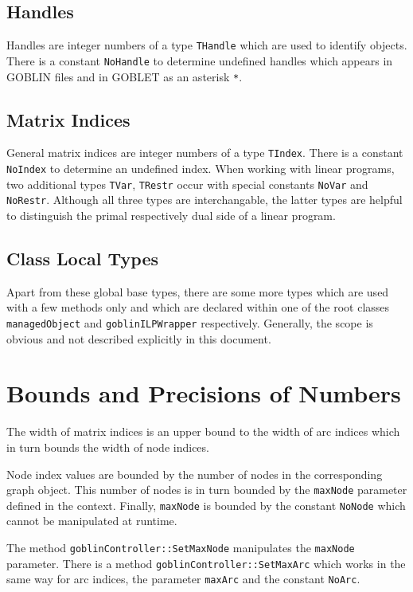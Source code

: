 \documentclass[a4paper,11pt,twoside]{book}
\begin{document}
\begin{multicols}{2}
\subsection{Handles}

Handles are integer numbers of a type \verb/THandle/ which are used to identify
objects. There is a constant \verb/NoHandle/ to determine undefined handles
which appears in GOBLIN files and in GOBLET as an asterisk \verb/*/.


\subsection{Matrix Indices}

General matrix indices are integer numbers of a type \verb/TIndex/. There is
a constant \verb/NoIndex/ to determine an undefined index. When working with
linear programs, two additional types \verb/TVar/, \verb/TRestr/ occur with
special constants \verb/NoVar/ and \verb/NoRestr/. Although all three types
are interchangable, the latter types are helpful to distinguish the primal
respectively dual side of a linear program.


\subsection{Class Local Types}

Apart from these global base types, there are some more types which are used
with a few methods only and which are declared within one of the root classes
\verb/managedObject/ and \verb/goblinILPWrapper/ respectively. Generally,
the scope is obvious and not described explicitly in this document.


\section{Bounds and Precisions of Numbers}

The width of matrix indices is an upper bound to the width of arc indices
which in turn bounds the width of node indices.

Node index values are bounded by the number of nodes in the corresponding
graph object. This number of nodes is in turn bounded by the \verb/maxNode/
parameter defined in the context. Finally, \verb/maxNode/ is bounded by
the constant \verb/NoNode/ which cannot be manipulated at runtime.

The method \verb/goblinController::SetMaxNode/ manipulates the \verb/maxNode/
parameter. There is a method \verb/goblinController::SetMaxArc/ which works in
the same way for arc indices, the parameter \verb/maxArc/ and the constant
\verb/NoArc/.


\end{multicols}
\end{document}

